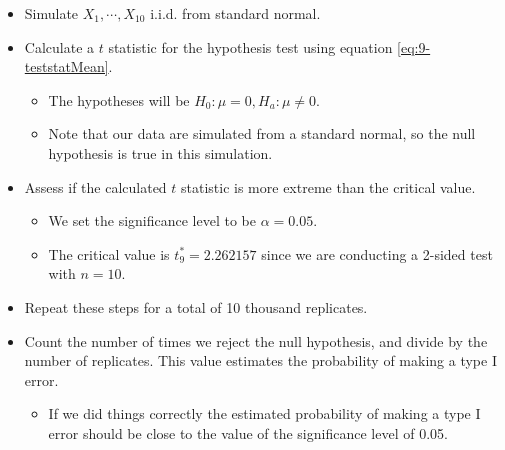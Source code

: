 \documentclass[
]{book}
\providecommand{\tightlist}{%
  \setlength{\itemsep}{0pt}\setlength{\parskip}{0pt}}
\begin{document}
\begin{itemize}
\tightlist
\item
  Simulate \(X_1, \cdots, X_{10}\) i.i.d. from standard normal.
\item
  Calculate a \(t\) statistic for the hypothesis test using equation \eqref{eq:9-teststatMean}.

  \begin{itemize}
  \tightlist
  \item
    The hypotheses will be \(H_0: \mu = 0, H_a: \mu \neq 0\).
  \item
    Note that our data are simulated from a standard normal, so the null hypothesis is true in this simulation.
  \end{itemize}
\item
  Assess if the calculated \(t\) statistic is more extreme than the critical value.

  \begin{itemize}
  \tightlist
  \item
    We set the significance level to be \(\alpha = 0.05\).
  \item
    The critical value is \(t_9^* = 2.262157\) since we are conducting a 2-sided test with \(n=10\).
  \end{itemize}
\item
  Repeat these steps for a total of 10 thousand replicates.
\item
  Count the number of times we reject the null hypothesis, and divide by the number of replicates. This value estimates the probability of making a type I error.

  \begin{itemize}
  \tightlist
  \item
    If we did things correctly the estimated probability of making a type I error should be close to the value of the significance level of 0.05.
  \end{itemize}
\end{itemize}
\end{document}
